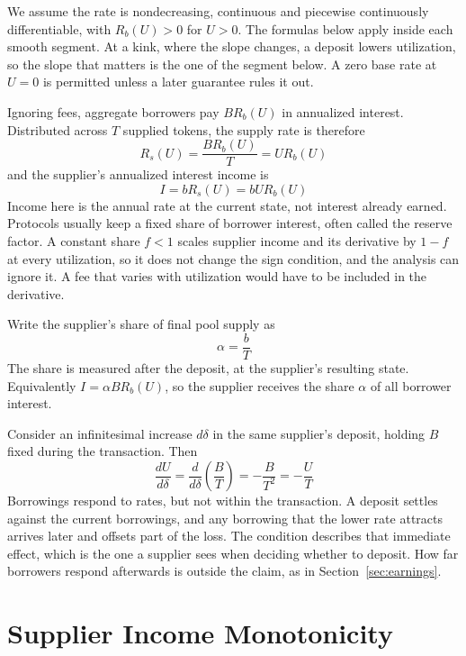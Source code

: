 \documentclass[11pt,a4paper]{article}
\begin{document}
We assume the rate is nondecreasing, continuous and piecewise continuously differentiable, with $R_b(U)>0$ for $U>0$. The formulas below apply inside each smooth segment. At a kink, where the slope changes, a deposit lowers utilization, so the slope that matters is the one of the segment below. A zero base rate at $U=0$ is permitted unless a later guarantee rules it out.

Ignoring fees, aggregate borrowers pay $BR_b(U)$ in annualized interest. Distributed across $T$ supplied tokens, the supply rate is therefore
\begin{equation}
R_s(U)=\frac{BR_b(U)}{T}=UR_b(U)
\end{equation}
and the supplier's annualized interest income is
\begin{equation}
I=bR_s(U)=bUR_b(U)
\end{equation}
Income here is the annual rate at the current state, not interest already earned. Protocols usually keep a fixed share of borrower interest, often called the reserve factor. A constant share $f<1$ scales supplier income and its derivative by $1-f$ at every utilization, so it does not change the sign condition, and the analysis can ignore it. A fee that varies with utilization would have to be included in the derivative.

Write the supplier's share of final pool supply as
\begin{equation}
\alpha=\frac{b}{T}
\end{equation}
The share is measured after the deposit, at the supplier's resulting state. Equivalently $I=\alpha BR_b(U)$, so the supplier receives the share $\alpha$ of all borrower interest.

Consider an infinitesimal increase $d\delta$ in the same supplier's deposit, holding $B$ fixed during the transaction. Then
\begin{equation}
\frac{dU}{d\delta}
=\frac{d}{d\delta}\left(\frac{B}{T}\right)
=-\frac{B}{T^2}
=-\frac{U}{T}
\end{equation}
Borrowings respond to rates, but not within the transaction. A deposit settles against the current borrowings, and any borrowing that the lower rate attracts arrives later and offsets part of the loss. The condition describes that immediate effect, which is the one a supplier sees when deciding whether to deposit. How far borrowers respond afterwards is outside the claim, as in Section~\ref{sec:earnings}.

\section{Supplier Income Monotonicity}
\label{sec:condition}
\end{document}
